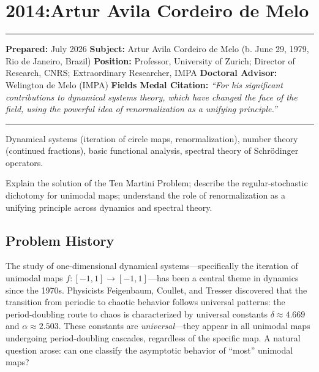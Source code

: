 \chapter{2014:Artur Avila Cordeiro de Melo}\label{ch2014arturavila:artur-avila-cordeiro-de-melo-fields-medal-2014}

\begin{center}\rule{0.5\linewidth}{0.5pt}\end{center}

\textbf{Prepared:} July 2026 \textbf{Subject:} Artur Avila Cordeiro de Melo (b. June 29, 1979, Rio de Janeiro, Brazil) \textbf{Position:} Professor, University of Zurich; Director of Research, CNRS; Extraordinary Researcher, IMPA \textbf{Doctoral Advisor:} Welington de Melo (IMPA) \textbf{Fields Medal Citation:} \emph{``For his significant contributions to dynamical systems theory, which have changed the face of the field, using the powerful idea of renormalization as a unifying principle.''}

\begin{center}\rule{0.5\linewidth}{0.5pt}\end{center}

\begin{prereqs} Dynamical systems (iteration of circle maps, renormalization), number theory (continued fractions), basic functional analysis, spectral theory of Schr\"{o}dinger operators. \end{prereqs}

\begin{objectives} Explain the solution of the Ten Martini Problem; describe the regular-stochastic dichotomy for unimodal maps; understand the role of renormalization as a unifying principle across dynamics and spectral theory. \end{objectives}

\section{Problem History}

The study of one-dimensional dynamical systems---specifically the iteration of unimodal maps $f:[-1,1]\to[-1,1]$---has been a central theme in dynamics since the 1970s. Physicists Feigenbaum, Coullet, and Tresser discovered that the transition from periodic to chaotic behavior follows universal patterns: the period-doubling route to chaos is characterized by universal constants $\delta\approx 4.669$ and $\alpha\approx 2.503$. These constants are \emph{universal}---they appear in all unimodal maps undergoing period-doubling cascades, regardless of the specific map. A natural question arose: can one classify the asymptotic behavior of ``most'' unimodal maps?

